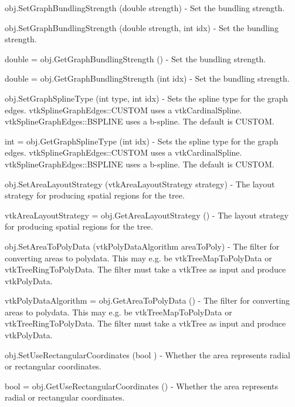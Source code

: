 \begin{DoxyItemize}
\item {\ttfamily obj.\-Set\-Graph\-Bundling\-Strength (double strength)} -\/ Set the bundling strength.  
\item {\ttfamily obj.\-Set\-Graph\-Bundling\-Strength (double strength, int idx)} -\/ Set the bundling strength.  
\item {\ttfamily double = obj.\-Get\-Graph\-Bundling\-Strength ()} -\/ Set the bundling strength.  
\item {\ttfamily double = obj.\-Get\-Graph\-Bundling\-Strength (int idx)} -\/ Set the bundling strength.  
\item {\ttfamily obj.\-Set\-Graph\-Spline\-Type (int type, int idx)} -\/ Sets the spline type for the graph edges. vtk\-Spline\-Graph\-Edges\-::\-C\-U\-S\-T\-O\-M uses a vtk\-Cardinal\-Spline. vtk\-Spline\-Graph\-Edges\-::\-B\-S\-P\-L\-I\-N\-E uses a b-\/spline. The default is C\-U\-S\-T\-O\-M.  
\item {\ttfamily int = obj.\-Get\-Graph\-Spline\-Type (int idx)} -\/ Sets the spline type for the graph edges. vtk\-Spline\-Graph\-Edges\-::\-C\-U\-S\-T\-O\-M uses a vtk\-Cardinal\-Spline. vtk\-Spline\-Graph\-Edges\-::\-B\-S\-P\-L\-I\-N\-E uses a b-\/spline. The default is C\-U\-S\-T\-O\-M.  
\item {\ttfamily obj.\-Set\-Area\-Layout\-Strategy (vtk\-Area\-Layout\-Strategy strategy)} -\/ The layout strategy for producing spatial regions for the tree.  
\item {\ttfamily vtk\-Area\-Layout\-Strategy = obj.\-Get\-Area\-Layout\-Strategy ()} -\/ The layout strategy for producing spatial regions for the tree.  
\item {\ttfamily obj.\-Set\-Area\-To\-Poly\-Data (vtk\-Poly\-Data\-Algorithm area\-To\-Poly)} -\/ The filter for converting areas to polydata. This may e.\-g. be vtk\-Tree\-Map\-To\-Poly\-Data or vtk\-Tree\-Ring\-To\-Poly\-Data. The filter must take a vtk\-Tree as input and produce vtk\-Poly\-Data.  
\item {\ttfamily vtk\-Poly\-Data\-Algorithm = obj.\-Get\-Area\-To\-Poly\-Data ()} -\/ The filter for converting areas to polydata. This may e.\-g. be vtk\-Tree\-Map\-To\-Poly\-Data or vtk\-Tree\-Ring\-To\-Poly\-Data. The filter must take a vtk\-Tree as input and produce vtk\-Poly\-Data.  
\item {\ttfamily obj.\-Set\-Use\-Rectangular\-Coordinates (bool )} -\/ Whether the area represents radial or rectangular coordinates.  
\item {\ttfamily bool = obj.\-Get\-Use\-Rectangular\-Coordinates ()} -\/ Whether the area represents radial or rectangular coordinates.  

\end{DoxyItemize}
